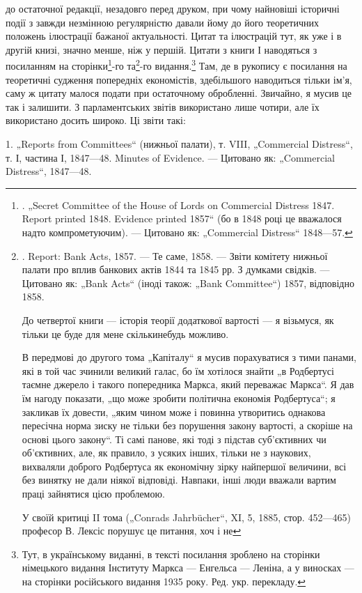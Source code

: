 до остаточної редакції, незадовго перед друком, при чому найновіші
історичні події з завжди незмінною регулярністю давали
йому до його теоретичних положень ілюстрації бажаної актуальності.
Цитат та ілюстрацій тут, як уже і в другій книзі, значно
менше, ніж у першій. Цитати з книги І наводяться з посиланням
на сторінки\footnote{
. „Secret Committee of the House of Lords on Commercial Distress
1847. Report printed 1848. Evidence printed 1857“ (бо в 1848 році
це вважалося надто компрометуючим). — Цитовано як: „Commercial
Distress“ 1848—57.
}-го та\footnote{
. Report: Bank Acts, 1857. — Те саме, 1858. — Звіти комітету
нижньої палати про вплив банкових актів 1844 та 1845 рр.
З думками свідків. — Цитовано як: „Bank Acts“ (іноді також:
„Bank Committee“) 1857, відповідно 1858.

До четвертої книги — історія теорії додаткової вартості —
я візьмуся, як тільки це буде для мене скількинебудь можливо.

В передмові до другого тома „Капіталу“ я мусив порахуватися
з тими панами, які в той час зчинили великий галас, бо
їм хотілося знайти „в Родбертусі таємне джерело і такого попередника
Маркса, який переважає Маркса“. Я дав їм нагоду
показати, „що може зробити політична економія Родбертуса“;
я закликав їх довести, „яким чином може і повинна утворитись
однакова пересічна норма зиску не тільки без порушення закону
вартості, а скоріше на основі цього закону“. Ті самі панове,
які тоді з підстав суб’єктивних чи об’єктивних, але, як правило,
з усяких інших, тільки не з наукових, вихваляли доброго Родбертуса
як економічну зірку найпершої величини, всі без винятку
не дали ніякої відповіді. Навпаки, інші люди вважали
вартим праці зайнятися цією проблемою.

У своїй критиці II тома („Conrads Jahrbücher“, XI, 5, 1885,
стор. 452—465) професор В. Лексіс порушує це питання, хоч і не
}-го видання.\footnote*{
Тут, в українському виданні, в тексті посилання зроблено на сторінки
німецького видання Інституту Маркса — Енгельса — Леніна, а у виносках — на сторінки
російського видання 1935 року. Ред. укр. перекладу.
} Там, де в рукопису є
посилання на теоретичні судження попередніх економістів, здебільшого
наводиться тільки ім’я, саму ж цитату малося подати
при остаточному обробленні. Звичайно, я мусив це так і залишити.
З парламентських звітів використано лише чотири, але
їх використано досить широко. Ці звіти такі:

1. „Reports from Committees“ (нижньої палати), т. VIII, „Commercial
Distress“, т. І, частина І, 1847—48. Minutes of Evidence. —
Цитовано як: „Commercial Distress“, 1847—48.